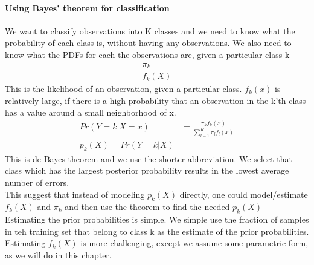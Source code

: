 \documentclass[../document.tex]{subfiles}
\begin{document}
	\paragraph{Using Bayes' theorem for classification}
	We want to classify observations into K classes and we need to know what the probability of each class is, without having any observations.
	We also need to know what the PDFs for each the observations are, given a particular class k
	\begin{equation}
	\begin{split}
		\pi_{k}\\
		f_{k}(X)
	\end{split}
	\end{equation}
	This is the likelihood of an observation, given a particular class. \(f_{k}(x)\) is relatively large, if there is a high probability that an observation in the k'th class has a value around a small neighborhood of x.
	\begin{equation}
	\begin{split}
		Pr(Y=k|X=x)&=\frac{\pi_{k}f_{k}(x)}{\sum_{l=1}^{K}\pi_{l}f_{l}(x)}\\
		p_{k}(X)=Pr(Y=k|X)&
	\end{split}
	\end{equation}
	This is de Bayes theorem and we use the shorter abbreviation. We select that class which has the largest posterior probability results in the lowest average number of errors.\\
	This suggest that instead of modeling \(p_{k}(X)\) directly, one could model/estimate \(f_{k}(X)\) and \(\pi_{k}\) and then use the theorem to find the needed \(p_{k}(X)\)\\
	Estimating the prior probabilities is simple. We simple use the fraction of samples in teh training set that belong to class k as the estimate of the prior probabilities.\\
	Estimating \(f_{k}(X)\) is more challenging, except we assume some parametric form, as we will do in this chapter.
\end{document}
